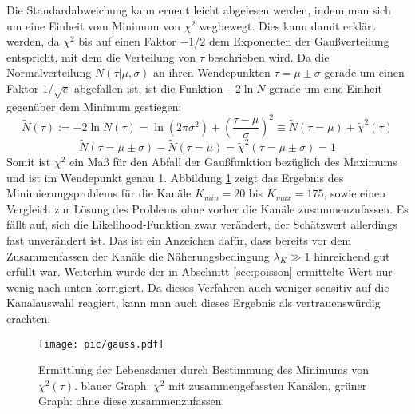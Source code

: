     Die Standardabweichung kann erneut leicht abgelesen werden, indem man sich um eine Einheit vom Minimum von $\chi^2$ wegbewegt. Dies kann damit erklärt werden, da $\chi^2$ bis auf einen Faktor $-1/2$ dem Exponenten der Gaußverteilung entspricht, mit dem die Verteilung von $\tau$ beschrieben wird. Da die Normalverteilung $N(\tau|\mu,\sigma)$ an ihren Wendepunkten $\tau = \mu \pm \sigma$ gerade um einen Faktor $1/\sqrt{e}$ abgefallen ist, ist die Funktion $-2 \ln N$ gerade um eine Einheit gegenüber dem Minimum gestiegen:
    	\begin{equation}
    	       \tilde{N}(\tau) := -2 \ln N(\tau) = \ln(2\pi\sigma^2)  + \left(\frac{\tau - \mu}{\sigma}\right)^2 \equiv \tilde{N}(\tau = \mu) + \tilde{\chi}^2(\tau)	
    	\end{equation}
    	\begin{equation}
    	    	\tilde{N}(\tau = \mu \pm \sigma) - \tilde{N}(\tau = \mu) = \tilde{\chi}^2(\tau = \mu \pm \sigma) = 1 	
    	 \end{equation}
    Somit ist $\chi^2$ ein Maß für den Abfall der Gaußfunktion bezüglich des Maximums und ist im Wendepunkt genau 1. Abbildung \ref{fig:LDgauss} zeigt  das Ergebnis des Minimierungsproblems für die Kanäle $K_{min} = 20$ bis $K_{max} = 175$, sowie einen Vergleich zur Lösung des Problems ohne vorher die Kanäle zusammenzufassen. Es fällt auf, sich die Likelihood-Funktion zwar verändert, der Schätzwert allerdings fast unverändert ist. Das ist ein Anzeichen dafür, dass bereits vor dem Zusammenfassen der Kanäle die Näherungsbedingung $\lambda_K \gg 1$ hinreichend gut erfüllt war. Weiterhin wurde der in Abschnitt \ref{sec:poisson} ermittelte Wert nur wenig nach unten korrigiert. Da dieses Verfahren auch weniger sensitiv auf die Kanalauswahl reagiert, kann man auch dieses Ergebnis als vertrauenswürdig erachten.
   		\begin{figure}[hp]
      		   			\centering
      		   			\captionsetup{justification=centering}
      		   			\texttt{[image: pic/gauss.pdf]}
      		   			\caption{Ermittlung der Lebensdauer durch Bestimmung des Minimums von $\chi^2(\tau)$. blauer Graph: $\chi^2$ mit zusammengefassten Kanälen, grüner Graph: ohne diese zusammenzufassen.}
      		   			\label{fig:LDgauss}	
      	\end{figure}
    
      		
      		